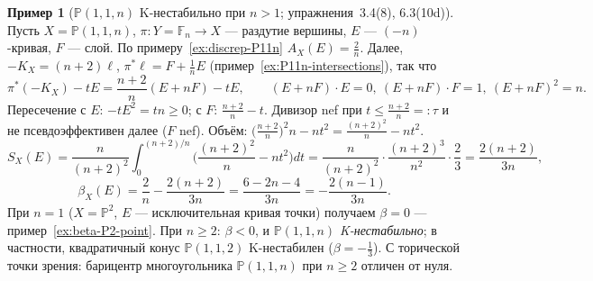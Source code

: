 \documentclass[11pt,a4paper]{article}
\theoremstyle{plain}
\theoremstyle{definition}
\newtheorem{example}[theorem]{Пример}
\theoremstyle{remark}
\newcommand{\PP}{\mathbb{P}}
\begin{document}
\begin{example}[$\PP(1,1,n)$ K-нестабильно при $n>1$; упражнения~3.4(8), 6.3(10d)]\label{ex:beta-P11n}
Пусть $X=\PP(1,1,n)$, $\pi\colon Y=\mathbb F_n\to X$ --- раздутие вершины, $E$ --- $(-n)$-кривая,
$F$ --- слой. По примеру~\ref{ex:discrep-P11n} $A_X(E)=\frac2n$. Далее, $-K_X=(n+2)\ell$,
$\pi^*\ell=F+\frac1nE$ (пример~\ref{ex:P11n-intersections}), так что
\[
\pi^*(-K_X)-tE=\frac{n+2}n(E+nF)-tE,\qquad (E+nF)\cdot E=0,\ (E+nF)\cdot F=1,\ (E+nF)^2=n .
\]
Пересечение с $E$: $-tE^2=tn\ge0$; с $F$: $\frac{n+2}n-t$. Дивизор nef при $t\le\frac{n+2}n=:\tau$
и не псевдоэффективен далее ($F$ nef). Объём: $\big(\frac{n+2}n\big)^2n-nt^2=\frac{(n+2)^2}n-nt^2$.
\[
S_X(E)=\frac n{(n+2)^2}\int_0^{(n+2)/n}\Big(\frac{(n+2)^2}n-nt^2\Big)dt
=\frac n{(n+2)^2}\cdot\frac{(n+2)^3}{n^2}\cdot\frac23=\frac{2(n+2)}{3n},
\]
\[
\beta_X(E)=\frac2n-\frac{2(n+2)}{3n}=\frac{6-2n-4}{3n}=-\frac{2(n-1)}{3n}.
\]
При $n=1$ ($X=\PP^2$, $E$ --- исключительная кривая точки) получаем $\beta=0$ --- пример~\ref{ex:beta-P2-point}.
При $n\ge2$: $\beta<0$, и \emph{$\PP(1,1,n)$ K-нестабильно}; в частности, квадратичный конус
$\PP(1,1,2)$ K-нестабилен ($\beta=-\frac13$). С торической точки зрения: барицентр многоугольника
$\PP(1,1,n)$ при $n\ge2$ отличен от нуля.
\end{example}
\end{document}
